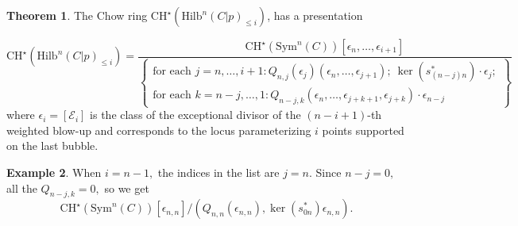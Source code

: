 \documentclass[10.5pt]{amsart}
\theoremstyle{definition}
\theoremstyle{definition}
\theoremstyle{definition}
\theoremstyle{definition}
\newtheorem{theorem}{Theorem}[section]
\newtheorem{lemma}[theorem]{Lemma}
\newtheorem{example}[theorem]{Example}
\newcommand{\Hilb}{\mathrm{Hilb}}
\newcommand{\cE}{\mathcal{E}}
\begin{document}

\begin{theorem}
    
\label{thm:chowringp}
  The Chow ring $\mathrm{CH}^\star(\Hilb^n(C|p)_{\leq i})$, has a presentation 

  $$\mathrm{CH}^\star(\Hilb^n(C|p)_{\leq i}) = \frac{\mathrm{CH}^\star(\mathrm{Sym}^n(C))[\epsilon_{n},\dots, \epsilon_{i+1}]}{\left\{\begin{array}{c}
   \text{for each }j = n, \dots, i+1: Q_{n,j}(\epsilon_{j})(\epsilon_{n},\dots,\epsilon_{j+1}); \ \ker(s_{(n-j)n}^*) \cdot \epsilon_{j}; \\ \text{for each } k = n-j, \dots, 1: Q_{n-j,k}(\epsilon_{n},\dots, \epsilon_{j+k+1}, \epsilon_{j+k})\cdot \epsilon_{n-j} 
  \end{array}\right\}}$$ where $\epsilon_i=[\cE_i]$ is the class of the exceptional divisor of the $(n-i+1)$-th weighted blow-up and corresponds to the locus parameterizing $i$ points supported on the last bubble.  
\end{theorem}
\begin{example}
  When $i = n-1,$ the indices in the list are $j = n.$ Since $n-j = 0,$ all the $Q_{n-j,k}=0,$ so we get $$\mathrm{CH}^\star(\mathrm{Sym}^n(C))[\epsilon_{n,n}]/(Q_{n,n}(\epsilon_{n,n}),\ker (s_{0n}^*)\epsilon_{n,n}).$$
\end{example}
\end{document}
